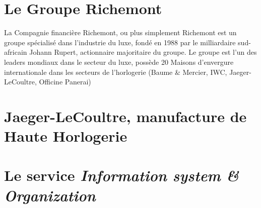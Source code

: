 \section{Le Groupe Richemont}
La Compagnie financière Richemont, ou plus simplement Richemont est un groupe spécialisé dans l'industrie du luxe, fondé en 1988 par le milliardaire sud-africain Johann Rupert, actionnaire majoritaire du groupe. Le groupe est l’un des leaders mondiaux dans le secteur du luxe, possède 20 Maisons d’envergure internationale dans les secteurs de l'horlogerie (Baume & Mercier, IWC, Jaeger-LeCoultre, Officine Panerai)

\section{Jaeger-LeCoultre, manufacture de Haute Horlogerie}

\section{Le service \textit{Information system \& Organization}}

